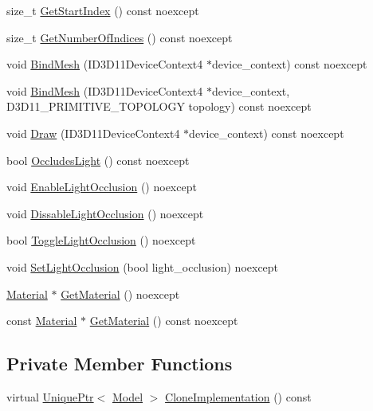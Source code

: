 \begin{DoxyCompactItemize}
\item 
size\+\_\+t \hyperlink{classmage_1_1_model_a876fcfe369f12e2d7edb6b533dd06252}{Get\+Start\+Index} () const noexcept
\item 
size\+\_\+t \hyperlink{classmage_1_1_model_a37c9814a445159fd742bcc1b9a5a7b94}{Get\+Number\+Of\+Indices} () const noexcept
\item 
void \hyperlink{classmage_1_1_model_a0ee2a2b1bed4600f052af46ffcf12884}{Bind\+Mesh} (I\+D3\+D11\+Device\+Context4 $\ast$device\+\_\+context) const noexcept
\item 
void \hyperlink{classmage_1_1_model_a3eb8cec219dd224e302f832690324e14}{Bind\+Mesh} (I\+D3\+D11\+Device\+Context4 $\ast$device\+\_\+context, D3\+D11\+\_\+\+P\+R\+I\+M\+I\+T\+I\+V\+E\+\_\+\+T\+O\+P\+O\+L\+O\+GY topology) const noexcept
\item 
void \hyperlink{classmage_1_1_model_aa0358375a2906b24ce4f3e0ddc4cdd01}{Draw} (I\+D3\+D11\+Device\+Context4 $\ast$device\+\_\+context) const noexcept
\item 
bool \hyperlink{classmage_1_1_model_a2ab5542819b80d58f349128a6c0194b5}{Occludes\+Light} () const noexcept
\item 
void \hyperlink{classmage_1_1_model_a5fd5e62a3365810d84af4cf9c202a9fa}{Enable\+Light\+Occlusion} () noexcept
\item 
void \hyperlink{classmage_1_1_model_a7e21b77f1f0afa83fef7a0398d6a9411}{Dissable\+Light\+Occlusion} () noexcept
\item 
bool \hyperlink{classmage_1_1_model_a68168e66cb04c08f27616e9d7768a99e}{Toggle\+Light\+Occlusion} () noexcept
\item 
void \hyperlink{classmage_1_1_model_aabcd12eeab9d6b81e27c727cb94cf57a}{Set\+Light\+Occlusion} (bool light\+\_\+occlusion) noexcept
\item 
\hyperlink{classmage_1_1_material}{Material} $\ast$ \hyperlink{classmage_1_1_model_a46728db5ca9052c62e9403ec7d6a6c21}{Get\+Material} () noexcept
\item 
const \hyperlink{classmage_1_1_material}{Material} $\ast$ \hyperlink{classmage_1_1_model_a10a9de6608365356b5b6ad2669ab39f8}{Get\+Material} () const noexcept
\end{DoxyCompactItemize}
\subsection*{Private Member Functions}
\begin{DoxyCompactItemize}
\item 
virtual \hyperlink{namespacemage_a3316d7143a973e37adf1110f2e80ca31}{Unique\+Ptr}$<$ \hyperlink{classmage_1_1_model}{Model} $>$ \hyperlink{classmage_1_1_model_a4e32ba81c5305dd23dfe760765a5b7d2}{Clone\+Implementation} () const
\end{DoxyCompactItemize}
